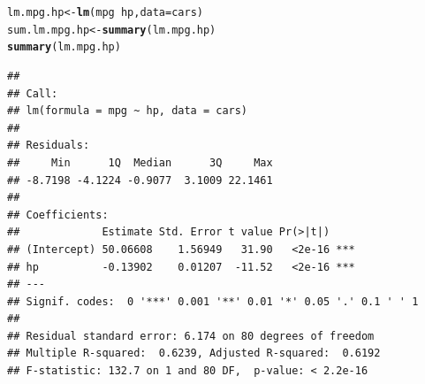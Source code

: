 \documentclass{article}\usepackage[]{graphicx}\usepackage[]{color}
\makeatletter
\newcommand{\hlopt}[1]{\textcolor[rgb]{0,0,0}{#1}}%
\newcommand{\hlstd}[1]{\textcolor[rgb]{0.345,0.345,0.345}{#1}}%
\newcommand{\hlkwb}[1]{\textcolor[rgb]{0.69,0.353,0.396}{#1}}%
\newcommand{\hlkwc}[1]{\textcolor[rgb]{0.333,0.667,0.333}{#1}}%
\newcommand{\hlkwd}[1]{\textcolor[rgb]{0.737,0.353,0.396}{\textbf{#1}}}%
\newenvironment{kframe}{%
 \def\at@end@of@kframe{}%
 \ifinner\ifhmode%
  \def\at@end@of@kframe{\end{minipage}}%
  \begin{minipage}{\columnwidth}%
 \fi\fi%
 \def\FrameCommand##1{\hskip\@totalleftmargin \hskip-\fboxsep
 \colorbox{shadecolor}{##1}\hskip-\fboxsep
     \hskip-\linewidth \hskip-\@totalleftmargin \hskip\columnwidth}%
 \MakeFramed {\advance\hsize-\width
   \@totalleftmargin\z@ \linewidth\hsize
   \@setminipage}}%
 {\par\unskip\endMakeFramed%
 \at@end@of@kframe}
\newenvironment{knitrout}{}{} %
\makeatother
\begin{document}
\begin{knitrout}
\begin{kframe}\begin{alltt}
\hlstd{lm.mpg.hp} \hlkwb{<-} \hlkwd{lm}\hlstd{(mpg} \hlopt{~} \hlstd{hp,} \hlkwc{data} \hlstd{= cars)}
\hlstd{sum.lm.mpg.hp} \hlkwb{<-} \hlkwd{summary}\hlstd{(lm.mpg.hp)}
\hlkwd{summary}\hlstd{(lm.mpg.hp)}
\end{alltt}
\begin{verbatim}
## 
## Call:
## lm(formula = mpg ~ hp, data = cars)
## 
## Residuals:
##     Min      1Q  Median      3Q     Max 
## -8.7198 -4.1224 -0.9077  3.1009 22.1461 
## 
## Coefficients:
##             Estimate Std. Error t value Pr(>|t|)    
## (Intercept) 50.06608    1.56949   31.90   <2e-16 ***
## hp          -0.13902    0.01207  -11.52   <2e-16 ***
## ---
## Signif. codes:  0 '***' 0.001 '**' 0.01 '*' 0.05 '.' 0.1 ' ' 1
## 
## Residual standard error: 6.174 on 80 degrees of freedom
## Multiple R-squared:  0.6239,	Adjusted R-squared:  0.6192 
## F-statistic: 132.7 on 1 and 80 DF,  p-value: < 2.2e-16
\end{verbatim}
\end{kframe}
\end{knitrout}
\end{document}
